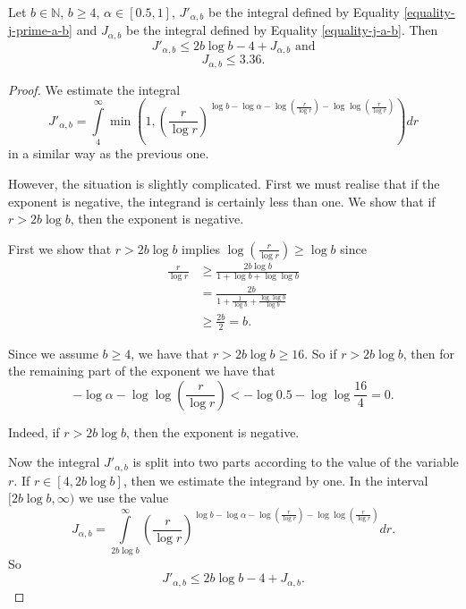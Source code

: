 \begin{lemma}
\label{lemma-estimate-j-a}
Let $b \in \mathbb{N}$, $b \geq 4$, $\alpha \in [0.5, 1]$, $J'_{\alpha, b}$ be the integral defined by Equality \ref{equality-j-prime-a-b} and $J_{\alpha, b}$ be the integral defined by Equality \ref{equality-j-a-b}. Then 
\[
	J'_{\alpha, b} \leq 2b \log b - 4 + J_{\alpha, b} \text{ and}
\]
\[
	J_{\alpha, b} \leq 3.36 \text{.}
\]
\end{lemma}
\begin{proof}
We estimate the integral \[ J'_{\alpha, b} = \int\limits_{4}^\infty \min \left(1, \left(\frac{r}{\log r}\right)^{\log b - \log \alpha - \log \left(\frac{r}{\log r}\right) - \log \log \left(\frac{r}{\log r}\right)}\right) dr \] in a similar way as the previous one. 

However, the situation is slightly complicated. First we must realise that if the exponent is negative, the integrand is certainly less than one. We show that if $r > 2 b \log b$, then the exponent is negative.

First we show that $r > 2 b \log b$ implies $\log \left( \frac{r}{\log r} \right) \geq \log b$ since
\[
\begin{split}
\frac{r}{\log r} 
	& \geq \frac{2 b \log b}{1 + \log b + \log \log b} \\
	& = \frac{2 b}{1 + \frac{1}{\log b} + \frac{\log \log b}{\log b}} \\
	& \geq \frac{2 b}{2} = b \text{.}
\end{split}
\]

Since we assume $b \geq 4$, we have that $r > 2 b \log b \geq 16$. So if $r > 2b \log b$, then for the remaining part of the exponent we have that \[ -\log \alpha - \log \log \left( \frac{r}{\log r} \right) < -\log 0.5 - \log \log \frac{16}{4} = 0 \text{.} \]

Indeed, if $r > 2 b \log b$, then the exponent is negative.

Now the integral $J'_{\alpha, b}$ is split into two parts according to the value of the variable $r$. If $r \in [4, 2b \log b]$, then we estimate the integrand by one. In the interval $[2b \log b, \infty)$ we use the value \[ J_{\alpha, b} = \int\limits_{2 b \log b}^\infty \left(\frac{r}{\log r}\right)^{\log b - \log \alpha - \log \left(\frac{r}{\log r}\right) - \log \log \left(\frac{r}{\log r}\right)} dr \text{.} \] So
\[
J'_{\alpha, b} \leq 2b \log b - 4 + J_{\alpha, b} \text{.}
\]


\end{proof}
